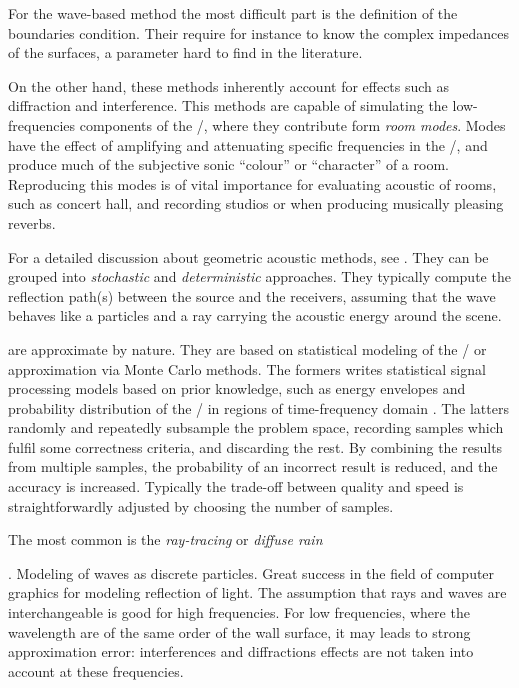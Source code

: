 For the wave-based method the most difficult part is the definition of the boundaries condition.
Their require for instance to know the complex impedances of the surfaces, a parameter hard to find in the literature.

On the other hand, these methods inherently account for effects such as diffraction and interference.
This methods are capable of simulating the low-frequencies components of the \RIR/, where they contribute form \textit{room modes}.
Modes have the effect of amplifying and attenuating specific frequencies in the \RIR/, and produce much of the subjective sonic “colour” or “character” of a room.
Reproducing this modes is of vital importance for evaluating acoustic of rooms, such as concert hall, and recording studios or when producing musically pleasing reverbs.


For a detailed discussion about geometric acoustic methods, see \cite{Savioja2015goemetric}.
They can be grouped into \textit{stochastic} and \textit{deterministic} approaches.
They typically compute the reflection path(s) between the source and the receivers,
assuming that the wave behaves like a particles and a ray carrying the acoustic energy around the scene.

 are approximate by nature.
They are based on statistical modeling of the \RIRs/ or approximation via Monte Carlo methods.
The formers writes statistical signal processing models based on prior knowledge,
such as energy envelopes and probability distribution of the \RIR/ in regions of time-frequency domain  \cite{Badeau2019common}.
The latters randomly and repeatedly subsample the problem space, recording samples which fulfil some correctness criteria, and discarding the rest.
By combining the results from multiple samples, the probability of an incorrect result is reduced, and the accuracy is increased.
Typically the trade-off between quality and speed is straightforwardly adjusted by choosing the number of samples.

The most common is the \textit{ray-tracing}\cite{Kulowski1985algorithmic} or \textit{diffuse rain}\cite{Schroeder2007fast, Heinz1993binaural, Wabniz2010}

.
Modeling of waves as discrete particles.
Great success in the field of computer graphics for modeling reflection of light.
The assumption that rays and waves are interchangeable is good for high frequencies.
For low frequencies, where the wavelength are of the same order of the wall surface, it may leads to strong approximation error:
interferences and diffractions effects are not taken into account at these frequencies\cite{Savioja2015goemetric}.

